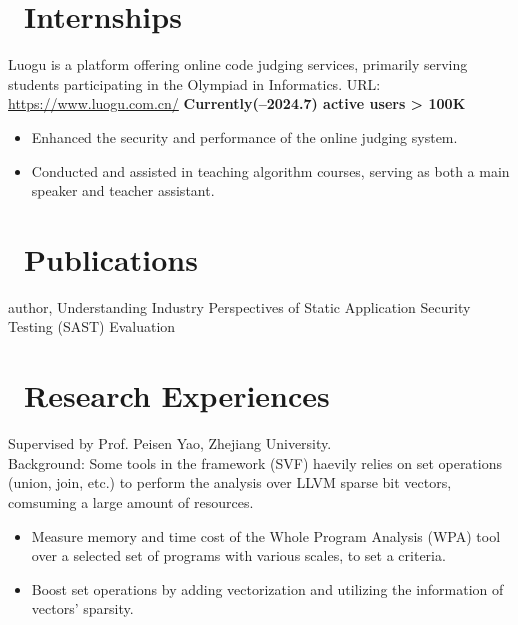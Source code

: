 \documentclass{resume}
\begin{document}
\section{\faUsers\ Internships}
Luogu is a platform offering online code judging services, primarily serving students participating in the Olympiad in Informatics.
URL: \href{https://www.luogu.com.cn/}{https://www.luogu.com.cn/}
\textbf{Currently(--2024.7) active users > 100K} \\
\begin{itemize}
  \item Enhanced the security and performance of the online judging system.
  \item Conducted and assisted in teaching algorithm courses, serving as both a main speaker and teacher assistant.
\end{itemize}

\section{\faBookmarkO\ Publications}
  author, Understanding Industry Perspectives of Static Application Security Testing (SAST) Evaluation

\section{\faSearch\ Research Experiences}
Supervised by Prof. Peisen Yao, Zhejiang University.\\
Background: Some tools in the framework (SVF) haevily relies on set operations (union, join, etc.) to perform the analysis over LLVM sparse bit vectors, comsuming a large amount of resources.
\begin{itemize}
  \item Measure memory and time cost of the Whole Program Analysis (WPA) tool over a selected set of programs with various scales, to set a criteria.
  \item Boost set operations by adding vectorization and utilizing the information of vectors' sparsity.
\end{itemize}
\end{document}

